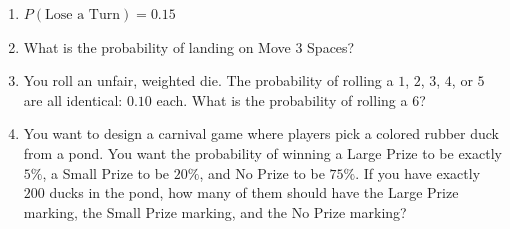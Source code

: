 \documentclass[12pt, letterpaper, fleqn]{article}
\newcommand{\blank}{\underline{\hspace{2.2cm}}}
\begin{document}
\vspace{3mm}

\begin{enumerate}[itemsep=5.5cm, leftmargin=0.6cm, resume]
\item $P(\text{Lose a Turn}) = 0.15$
\item What is the probability of landing on Move $3$ Spaces? \blank
\item You roll an unfair, weighted die. The probability of rolling a $1$, $2$, $3$, $4$, or $5$ are all identical: $0.10$ each. What is the probability of rolling a $6$?
\item You want to design a carnival game where players pick a colored rubber duck from a pond. You want the probability of winning a Large Prize to be exactly $5\%$, a Small Prize to be $20\%$, and No Prize to be $75\%$. If you have exactly $200$ ducks in the pond, how many of them should have the Large Prize marking, the Small Prize marking, and the No Prize marking?
\end{enumerate}
\end{document}
